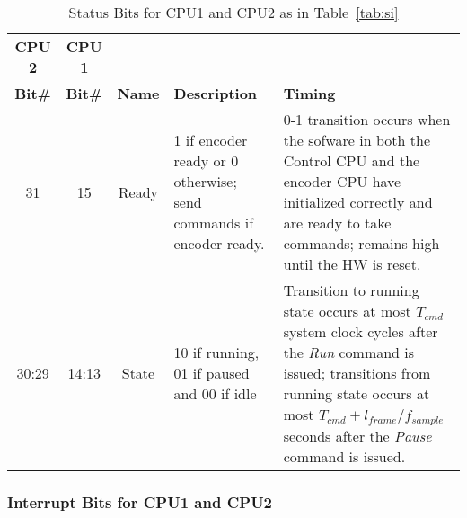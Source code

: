 \documentclass{ug}
\theoremstyle{plain}
\begin{document}
\begin{table}[H]
  \begin{center}
    \begin{tabular}{|c|c|c|p{4cm}|p{5cm}|}
      \hline
      \rowcolor{iob-green}
      \textbf{CPU 2}  & \textbf{CPU 1}  & \cellcolor{iob-green} & \cellcolor{iob-green}  & \cellcolor{iob-green}\\ 
      \rowcolor{iob-green}
      \textbf{Bit\#}  & \textbf{Bit\#} & \multirow{-2}{*}{\cellcolor{iob-green} \textbf{Name}} & \multirow{-2}{*}{\cellcolor{iob-green}\textbf{Description}} & \multirow{-2}{*}{\cellcolor{iob-green}\textbf{Timing}} \\
      \hline
      \hline

      31 & 15 & Ready & 1 if encoder ready or 0 otherwise; send commands if
      encoder ready. & 0-1 transition occurs when the sofware in both the
      Control CPU and the encoder CPU have initialized correctly and are ready
      to take commands; remains high until the HW is reset.\\ \hline

      \rowcolor{iob-blue} 30:29 & 14:13 & State & 10 if running, 01 if paused
      and 00 if idle & Transition to running state occurs at most $T_{cmd}$
      system clock cycles after the \textit{Run} command is issued; transitions
      from running state occurs at most $T_{cmd} + l_{frame} / f_{sample}$
      seconds after the \textit{Pause} command is issued.\\ \hline

    \end{tabular}
    \caption{Status Bits for CPU1 and CPU2 as in Table~\ref{tab:si}}
    \label{tab:status}
  \end{center}
\end{table}
\clearpage


\subsubsection{Interrupt Bits for CPU1 and CPU2}
\end{document}
